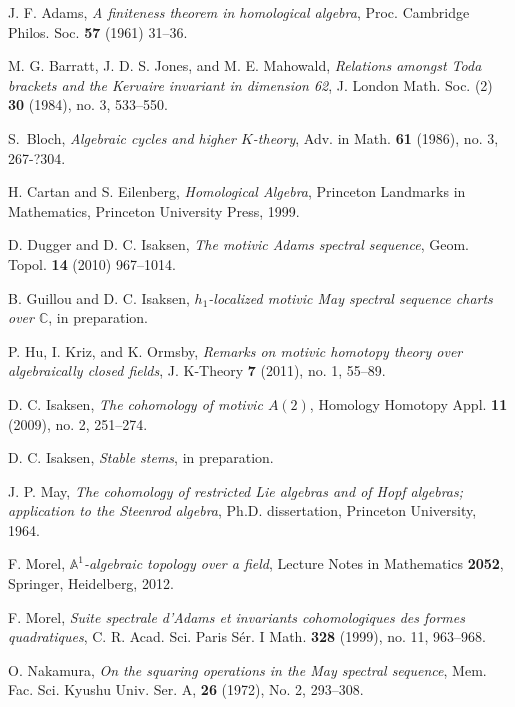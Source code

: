 \documentclass[10pt]{amsart}
\begin{document}
\begin{thebibliography}{NSO}

J. F. Adams,
{\it A finiteness theorem in homological algebra},
Proc. Cambridge Philos. Soc. \textbf{57} (1961) 31--36. 

M. G. Barratt, J. D. S. Jones, and M. E. Mahowald, 
{\it Relations amongst Toda brackets and the Kervaire invariant in dimension 62},
J. London Math. Soc. (2) \textbf{30} (1984), no. 3, 533--550. 

S.\ Bloch, 
{\it Algebraic cycles and higher $K$-theory},
Adv. in Math. \textbf{61} (1986), no. 3, 267-?304. 

H. Cartan and S. Eilenberg,
{\it Homological Algebra},
Princeton Landmarks in Mathematics, Princeton University Press, 1999.

D. Dugger and D. C. Isaksen,
{\it The motivic Adams spectral sequence},
Geom. Topol. {\bf 14} (2010) 967--1014.

B. Guillou and D. C. Isaksen,
{\it $h_1$-localized motivic May spectral sequence charts over ${\ensuremath{\mathbb{C}}}$},
in preparation.

P. Hu, I. Kriz, and K. Ormsby, 
{\it Remarks on motivic homotopy theory over algebraically closed fields},
J. K-Theory \textbf{7} (2011), no. 1, 55--89.

D. C. Isaksen,
{\it The cohomology of motivic $A(2)$},
Homology Homotopy Appl. {\bf 11} (2009), no. 2, 251--274. 

D. C. Isaksen,
{\it Stable stems},
in preparation.

J. P. May,
{\it The cohomology of restricted Lie algebras and of Hopf algebras; application to the Steenrod algebra},
Ph.D. dissertation, Princeton University, 1964.

F. Morel, 
{\it $\mathbb{A}^1$-algebraic topology over a field},
Lecture Notes in Mathematics \textbf{2052}, Springer, Heidelberg, 2012. 

F. Morel, 
{\it Suite spectrale d'Adams et invariants cohomologiques des formes quadratiques}, 
C. R. Acad. Sci. Paris S\'er. I Math. \textbf{328} (1999), no. 11, 963--968. 

O. Nakamura,
{\it On the squaring operations in the May spectral sequence},
Mem. Fac. Sci. Kyushu Univ.
Ser. A, {\bf 26} (1972), No. 2, 293--308.


\end{thebibliography}
\end{document}
